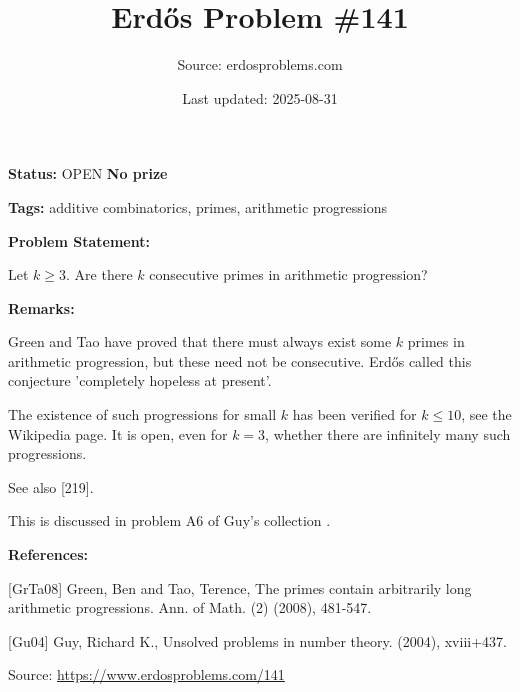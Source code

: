 \documentclass{article}
\title{Erd\H{o}s Problem \#141}
\date{Last updated: 2025-08-31}
\author{Source: erdosproblems.com}
\begin{document}
\maketitle

\noindent\textbf{Status:} OPEN \quad \textbf{No prize}

\noindent\textbf{Tags:} additive combinatorics, primes, arithmetic progressions

\medskip
\noindent\textbf{Problem Statement:}

Let $k\geq 3$. Are there $k$ consecutive primes in arithmetic progression?

\bigskip
\noindent\textbf{Remarks:}

Green and Tao \cite{GrTa08} have proved that there must always exist some $k$ primes in arithmetic progression, but these need not be consecutive. Erd\H{o}s called this conjecture 'completely hopeless at present'.

The existence of such progressions for small $k$ has been verified for $k\leq 10$, see the Wikipedia page. It is open, even for $k=3$, whether there are infinitely many such progressions.

See also [219].

This is discussed in problem A6 of Guy's collection \cite{Gu04}.

\bigskip
\noindent\textbf{References:}

[GrTa08] Green, Ben and Tao, Terence, The primes contain arbitrarily long arithmetic progressions. Ann. of Math. (2) (2008), 481-547.
 
 [Gu04] Guy, Richard K., Unsolved problems in number theory. (2004), xviii+437.

\bigskip
\noindent\small{Source: \url{https://www.erdosproblems.com/141}}
\end{document}
